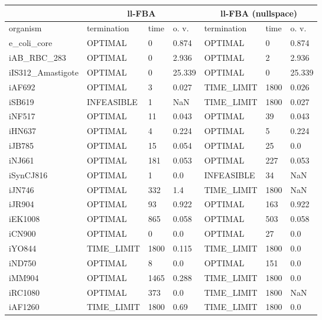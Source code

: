 \begin{table}[!ht]
    \small
    \centering
    \begin{tabular}{|l|l|l|l|l|l|l|}
    \hline
        \multicolumn{1}{|c}{} & \multicolumn{3}{|c|}{ll-FBA} & \multicolumn{3}{c|}{ll-FBA (nullspace)}\\ \hline 
        organism & termination & time & o. v. & termination & time & o. v. \\ \hline
        e\_coli\_core & OPTIMAL & 0 & 0.874 & OPTIMAL & 0 & 0.874 \\ \hline
        iAB\_RBC\_283 & OPTIMAL & 0 & 2.936 & OPTIMAL & 2 & 2.936 \\ \hline
        iIS312\_Amastigote & OPTIMAL & 0 & 25.339 & OPTIMAL & 0 & 25.339 \\ \hline
        iAF692 & OPTIMAL & 3 & 0.027 & TIME\_LIMIT & 1800 & 0.026 \\ \hline
        iSB619 & INFEASIBLE & 1 & NaN & TIME\_LIMIT & 1800 & 0.027 \\ \hline
        iNF517 & OPTIMAL & 11 & 0.043 & OPTIMAL & 39 & 0.043 \\ \hline
        iHN637 & OPTIMAL & 4 & 0.224 & OPTIMAL & 5 & 0.224 \\ \hline
        iJB785 & OPTIMAL & 15 & 0.054 & OPTIMAL & 25 & 0.0 \\ \hline
        iNJ661 & OPTIMAL & 181 & 0.053 & OPTIMAL & 227 & 0.053 \\ \hline
        iSynCJ816 & OPTIMAL & 1 & 0.0 & INFEASIBLE & 34 & NaN \\ \hline
        iJN746 & OPTIMAL & 332 & 1.4 & TIME\_LIMIT & 1800 & NaN \\ \hline
        iJR904 & OPTIMAL & 93 & 0.922 & OPTIMAL & 163 & 0.922 \\ \hline
        iEK1008 & OPTIMAL & 865 & 0.058 & OPTIMAL & 503 & 0.058 \\ \hline
        iCN900 & OPTIMAL & 0 & 0.0 & OPTIMAL & 27 & 0.0 \\ \hline
        iYO844 & TIME\_LIMIT & 1800 & 0.115 & TIME\_LIMIT & 1800 & 0.0 \\ \hline
        iND750 & OPTIMAL & 8 & 0.0 & OPTIMAL & 151 & 0.0 \\ \hline
        iMM904 & OPTIMAL & 1465 & 0.288 & TIME\_LIMIT & 1800 & 0.0 \\ \hline
        iRC1080 & OPTIMAL & 373 & 0.0 & TIME\_LIMIT & 1800 & NaN \\ \hline
        iAF1260 & TIME\_LIMIT & 1800 & 0.69 & TIME\_LIMIT & 1800 & 0.0 \\ \hline

\end{tabular}
\end{table}
